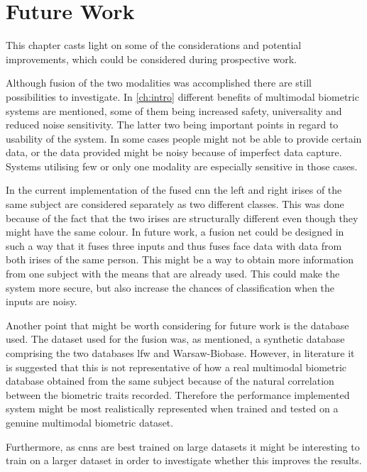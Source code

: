 \chapter{Future Work}
\label{ch:future_work}
This chapter casts light on some of the considerations and potential improvements, which could be considered during prospective work. 

Although fusion of the two modalities was accomplished there are still possibilities to investigate. 
In \autoref{ch:intro} different benefits of multimodal biometric systems are mentioned, some of them being increased safety, universality and reduced noise sensitivity. The latter two being important points in regard to usability of the system. In some cases people might not be able to provide certain data, or the data provided might be noisy because of imperfect data capture. Systems utilising few or only one modality are especially sensitive in those cases. 

In the current implementation of the fused \gls{cnn} the left and right irises of the same subject are considered separately as two different classes. This was done because of the fact that the two irises are structurally different even though they might have the same colour. In future work, a fusion net could be designed in such a way that it fuses three inputs and thus fuses face data with data from both irises of the same person. This might be a way to obtain more information from one subject with the means that are already used. This could make the system more secure, but also increase the chances of classification when the inputs are noisy. 

Another point that might be worth considering for future work is the database used. The dataset used for the fusion was, as mentioned, a synthetic database comprising the two databases \gls{lfw} and Warsaw-Biobase.  However, in literature it is suggested that this is not representative of how a real multimodal biometric database obtained from the same subject because of the natural correlation between the biometric traits recorded. Therefore the performance implemented system might be most realistically represented when trained and tested on a genuine multimodal biometric dataset. 

Furthermore, as \gls{cnn}s are best trained on large datasets it might be interesting to train on a larger dataset in order to investigate whether this improves the results. 


